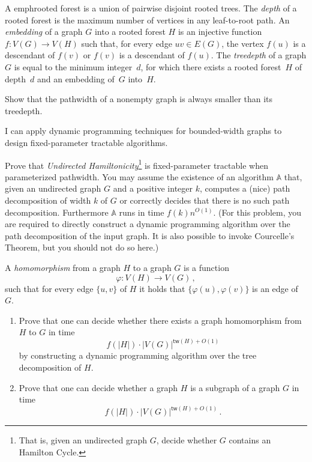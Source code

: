 \documentclass{uebung_cs}
\begin{document}
  \begin{exercise}[Treedepth][\hard]
    A emph{rooted forest} is a union of pairwise disjoint rooted trees. The \emph{depth} of a rooted forest is the maximum number of vertices in any leaf-to-root path. An \emph{embedding} of a graph $G$ into a rooted forest $H$ is an injective function $f \colon V (G) \rightarrow V(H)$ such that, for every edge $uv \in E(G)$, the vertex $f(u)$ is a descendant of $f(v)$ or $f(v)$ is a descendant of $f(u)$. The \emph{treedepth} of a graph $G$ is equal to the minimum integer~$d$, for which there exists a rooted forest~$H$ of depth~$d$ and an embedding of~$G$ into~$H$.

    Show that the pathwidth of a nonempty graph is always smaller than its treedepth.
  \end{exercise}
  
  \newpage
  \begin{skill}
    I can apply dynamic programming techniques for bounded-width graphs to design fixed-parameter tractable algorithms.
  \end{skill}

  \begin{exercise}
    Prove that \emph{Undirected Hamiltonicity}\footnote{That is, given an undirected graph $G$, decide whether $G$ contains an Hamilton Cycle.} is fixed-parameter tractable when parameterized pathwidth. You may assume the existence of an algorithm $\mathbb{A}$ that, given an undirected graph $G$ and a positive integer $k$, computes a (nice) path decomposition of width $k$ of $G$ or correctly decides that there is no such path decomposition. Furthermore $\mathbb{A}$ runs in time $f(k) n^{O(1)}$. (For this problem, you are required to directly construct a dynamic programming algorithm over the path decomposition of the input graph. It is also possible to invoke Courcelle's Theorem, but you should not do so here.)
    \end{exercise}

  \begin{exercise}%
  A \emph{homomorphism} from a graph $H$ to a graph $G$ is a function \[\varphi:V(H)\rightarrow V(G) \,, \] such that for every edge $\{u,v\}$ of $H$ it holds that $\{\varphi(u),\varphi(v)\}$ is an edge of $G$. 
  \begin{enumerate}
  \item Prove that one can decide whether there exists a graph homomorphism from $H$ to $G$ in time
  \[f(|H|)\cdot |V(G)|^{\mathsf{tw}(H)+O(1)} \]
  by constructing a dynamic programming algorithm over the tree decomposition of $H$.
  \item Prove that one can decide whether a graph $H$ is a subgraph of a graph $G$ in time
  \[f(|H|)\cdot |V(G)|^{\mathsf{tw}(H)+O(1)} \,.\]
  \end{enumerate}
  \end{exercise}
  
\end{document}
